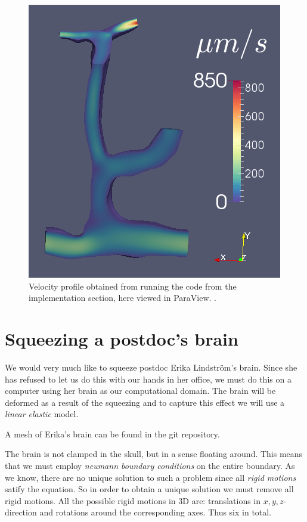 \documentclass[epsfig,11pt]{article}
\begin{document}
\begin{figure}[h!] 
\begin{center}
  \includegraphics[scale=0.5]{vel_prof.png}
  \end{center}
  \caption{Velocity profile obtained from running the code from the implementation section, here viewed in ParaView. .}
 \label{fig:velocity_profile}
\end{figure}


\section{Squeezing a postdoc's brain}

We would very much like to squeeze postdoc Erika Lindström's brain. Since she has refused to let us do this with our hands in her office, we must do this on a computer using her brain as our computational domain. The brain will be deformed as a result of the squeezing and to capture this effect we will use a \emph{linear elastic} model. 

A mesh of Erika's brain can be found in the git repository. 

The brain is not clamped in the skull, but in a sense floating around. This means that we must employ \emph{neumann boundary conditions} on the entire boundary. As we know, there are no unique solution to such a problem since all \emph{rigid motions} satify the equation. So in order to obtain a unique solution we must remove all rigid motions. All the possible rigid motions in 3D are: translations in $x,y,z$-direction and rotations around the corresponding axes. Thus six in total.
\end{document}
